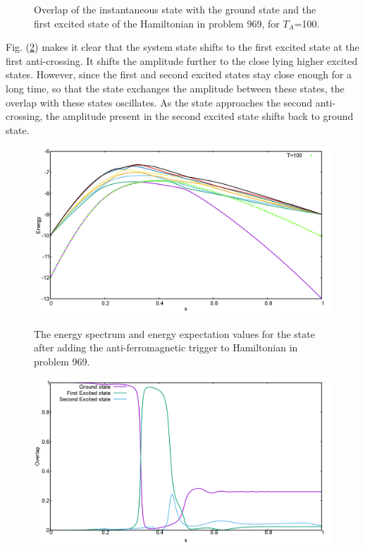 \documentclass[../main.tex]{subfiles}
\begin{document}
\begin{itemize}
\begin{figure}[H]
\caption{Overlap of the instantaneous state with the ground state and the first excited state of the Hamiltonian in problem 969, for $T_A$=100.}
\end{figure}
Fig. (\ref{fig:a50}) makes it clear that the system state shifts to the first excited state at the first anti-crossing. It shifts the amplitude further to the close lying higher excited states. However, since the first and second excited states stay close enough for a long time, so that the state exchanges the amplitude between these states, the overlap with these states oscillates. As the state approaches the second anti-crossing, the amplitude present in the second excited state shifts back to ground state.
\begin{figure}[H]
\centering
  \includegraphics[scale=0.24]{969_A_T100_g1.png}
  \label{fig:a49}
  \caption{The energy spectrum and energy expectation values for the state after adding the anti-ferromagnetic trigger to Hamiltonian in problem 969.}
 \end{figure}

\begin{figure}[H]
  \centering
  \includegraphics[scale=0.24]{969_A_g1_Overlap.png}
  \label{fig:a50}


\end{figure}
\end{itemize}
\end{document}
